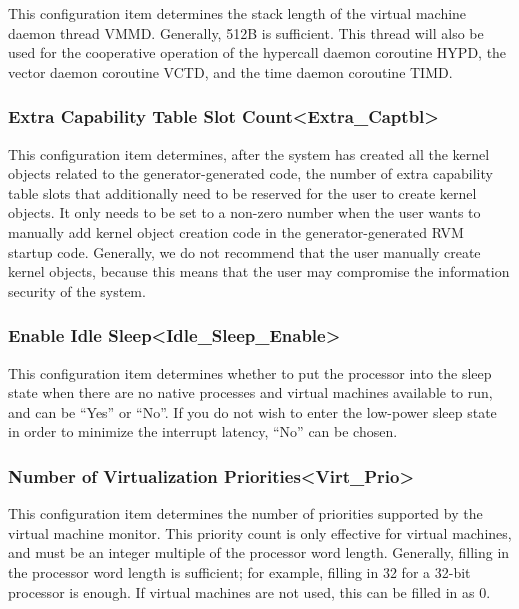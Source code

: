 This configuration item determines the stack length of the virtual machine daemon thread VMMD. Generally, 512B is sufficient. This thread will also be used for the cooperative operation of the hypercall daemon coroutine HYPD, the vector daemon coroutine VCTD, and the time daemon coroutine TIMD.

\subsubsection{Extra Capability Table Slot Count<Extra\_Captbl>{}}\label{subsubsec:5-3-13-6}

This configuration item determines, after the system has created all the kernel objects related to the generator-generated code, the number of extra capability table slots that additionally need to be reserved for the user to create kernel objects. It only needs to be set to a non-zero number when the user wants to manually add kernel object creation code in the generator-generated RVM startup code. Generally, we do not recommend that the user manually create kernel objects, because this means that the user may compromise the information security of the system.

\subsubsection{Enable Idle Sleep<Idle\_Sleep\_Enable>{}}\label{subsubsec:5-3-13-7}

This configuration item determines whether to put the processor into the sleep state when there are no native processes and virtual machines available to run, and can be ``Yes'' or ``No''. If you do not wish to enter the low-power sleep state in order to minimize the interrupt latency, ``No'' can be chosen.

\subsubsection{Number of Virtualization Priorities<Virt\_Prio>{}}\label{subsubsec:5-3-13-8}

This configuration item determines the number of priorities supported by the virtual machine monitor. This priority count is only effective for virtual machines, and must be an integer multiple of the processor word length. Generally, filling in the processor word length is sufficient; for example, filling in 32 for a 32-bit processor is enough. If virtual machines are not used, this can be filled in as 0.

